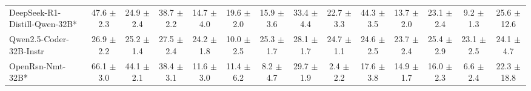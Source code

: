 \documentclass{llmxive}
\begin{document}
\begin{table}[hbt]
{\begin{tabular}{l *{13}{c}}
DeepSeek-R1-Distill-Qwen-32B* &
47.6 {\tiny$\pm$ 2.3} &
24.9 {\tiny$\pm$ 2.4} &
38.7 {\tiny$\pm$ 2.2} &
14.7 {\tiny$\pm$ 4.0} &
19.6 {\tiny$\pm$ 2.0} &
15.9 {\tiny$\pm$ 3.6} &
33.4 {\tiny$\pm$ 4.4} &
22.7 {\tiny$\pm$ 3.3} &
44.3 {\tiny$\pm$ 3.5} &
13.7 {\tiny$\pm$ 2.0} &
23.1 {\tiny$\pm$ 2.4} &
9.2 {\tiny$\pm$ 1.3} &
25.6 {\tiny$\pm$ 12.6} \\


\rowcolor{gray!10}
Qwen2.5-Coder-32B-Instr &
26.9 {\tiny$\pm$ 2.2} &
25.2 {\tiny$\pm$ 1.4} &
27.5 {\tiny$\pm$ 2.4} &
24.2 {\tiny$\pm$ 1.8} &
10.0 {\tiny$\pm$ 2.5} &
25.3 {\tiny$\pm$ 1.7} &
28.1 {\tiny$\pm$ 1.7} &
24.7 {\tiny$\pm$ 1.1} &
24.6 {\tiny$\pm$ 2.5} &
23.7 {\tiny$\pm$ 2.4} &
25.4 {\tiny$\pm$ 2.9} &
23.1 {\tiny$\pm$ 2.5} &
24.1 {\tiny$\pm$ 4.7} \\





OpenRsn-Nmt-32B* &
66.1 {\tiny$\pm$ 3.0} &
44.1 {\tiny$\pm$ 2.1} &
38.4 {\tiny$\pm$ 3.1} &
11.6 {\tiny$\pm$ 3.0} &
11.4 {\tiny$\pm$ 6.2} &
8.2 {\tiny$\pm$ 4.7} &
29.7 {\tiny$\pm$ 1.9} &
2.4 {\tiny$\pm$ 2.2} &
17.6 {\tiny$\pm$ 3.8} &
14.9 {\tiny$\pm$ 1.7} &
16.0 {\tiny$\pm$ 2.3} &
6.6 {\tiny$\pm$ 2.4} &
22.3 {\tiny$\pm$ 18.8} \\



\end{tabular}}
\end{table}
\end{document}
